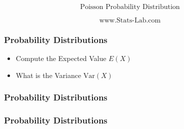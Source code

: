 \documentclass{beamer}
\begin{document}
\begin{frame}


\Large
\[ \mbox{Poisson Probability Distribution}  \]

\[ \mbox{www.Stats-Lab.com}\]


\end{frame}
\begin{frame}
\frametitle{Probability Distributions}

\begin{itemize}
\item Compute the Expected Value $E(X)$
\item What is the Variance $\mbox{Var}(X)$
\end{itemize}


\end{frame}
\begin{frame}
\frametitle{Probability Distributions}


\end{frame}
\begin{frame}
\frametitle{Probability Distributions}


\end{frame}
\end{document}

